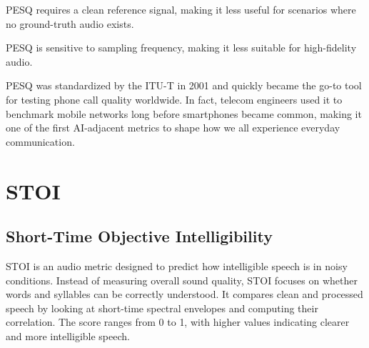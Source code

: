 {
\item PESQ requires a clean reference signal, making it less useful for scenarios where no ground-truth audio exists.
\item PESQ is sensitive to sampling frequency, making it less suitable for high-fidelity audio.
}

\clearpage

\thispagestyle{customstyle}

{PESQ was standardized by the ITU-T in 2001 and quickly became the go-to tool for testing phone call quality worldwide. 
In fact, telecom engineers used it to benchmark mobile networks long before smartphones became common, making it one of the
first AI-adjacent metrics to shape how we all experience everyday communication.}

\clearpage
\thispagestyle{genaistyle}
\section{STOI}
\subsection{Short-Time Objective Intelligibility}



STOI is an audio metric designed to predict how intelligible speech is in noisy conditions. Instead of measuring overall sound quality,
STOI focuses on whether words and syllables can be correctly understood. It compares clean and processed speech by looking at short-time
spectral envelopes and computing their correlation. The score ranges from 0 to 1, with higher values indicating clearer and more
intelligible speech.

